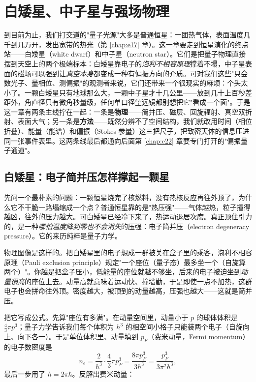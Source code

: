 \chapter{白矮星、中子星与强场物理}
\label{chap:e18}

\begin{chapteropening}
到目前为止，我们打交道的"量子光源"大多是普通恒星：一团热气体，表面温度几千到几万开，发出宽带的热光（第 \ref{chap:e17} 章）。这一章要走到恒星演化的终点站——白矮星（white dwarf）和中子星（neutron star）。它们是把量子物理直接摆到天空上的两个极端标本：白矮星靠电子的\emph{泡利不相容原理}撑着不塌，中子星表面的磁场可以强到让\emph{真空本身}都变成一种有偏振方向的介质。可对我们这些"只会数光子、量相位、测偏振"的观测者来说，它们还带来一个很现实的麻烦：个头太小了。一颗白矮星只有地球那么大，一颗中子星才十几公里——放到几十上百秒差距外，角直径只有微角秒量级，任何单口径望远镜都别想把它"看成一个面"。于是这一章有两条主线拧在一起：一条是\textbf{物理}——简并压、磁层、回旋辐射、真空双折射、表面大气；另一条是\textbf{方法}——既然分辨不了空间结构，我们就改用时间（相位折叠）、能量（能谱）和偏振（Stokes 参量）这三把尺子，把致密天体的信息压进同一张事件表里。这两条线最后都通向后面第 \ref{chap:e22} 章要专门打开的"偏振量子通道"。
\end{chapteropening}


\section{白矮星：电子简并压怎样撑起一颗星}
\label{sec:e18-degeneracy}

先问一个最朴素的问题：一颗恒星烧完了核燃料，没有热核反应再往外顶了，为什么它不干脆一路塌缩成一个点？普通恒星靠的是"热压强"——气体越热，粒子撞得越凶，往外的压力越大。可白矮星已经冷下来了，热运动退居次席。真正顶住引力的，是一种\emph{哪怕温度降到零也不会消失}的压强：电子简并压（electron degeneracy pressure）。它的来历纯粹是量子力学。

物理图像是这样的。把白矮星里的电子想成一群被关在盒子里的乘客，泡利不相容原理（Pauli exclusion principle）规定"一个座位（量子态）最多坐一个（自旋算两个）"。你越是把盒子压小，低能量的座位就越不够坐，后来的电子被迫坐到\emph{动量很高}的座位上去。动量高就意味着运动快、撞墙勤，于是即使一点不加热，这群电子也会拼命往外顶。密度越大，被顶到的动量越高，压强也越大——这就是简并压。

把它写成公式。先算"座位有多满"。在动量空间里，动量小于 \(p\) 的球体体积是 \(\tfrac{4}{3}\pi p^3\)；量子力学告诉我们每个体积为 \(h^3\) 的相空间小格子只能装两个电子（自旋向上、向下各一）。于是单位体积里、动量填到 \(p_F\)（费米动量，Fermi momentum）的电子数密度是
\[
  n_e=\frac{2}{h^3}\cdot\frac{4}{3}\pi p_F^3
     =\frac{8\pi p_F^3}{3h^3}
     =\frac{p_F^3}{3\pi^2\hbar^3},
\]
最后一步用了 \(h=2\pi\hbar\)。反解出费米动量：

